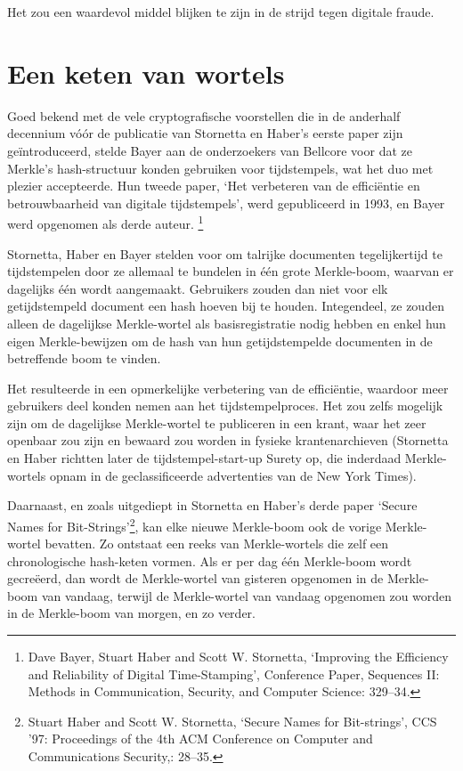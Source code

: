 \documentclass[
  a5paper,
  smalldemyvopaper,11pt,twoside,onecolumn,openright,extrafontsizes]{memoir}
\begin{document}
Het zou een waardevol middel blijken te zijn in de strijd tegen digitale
fraude.

\section{Een keten van wortels}\label{een-keten-van-wortels}

Goed bekend met de vele cryptografische voorstellen die in de anderhalf
decennium vóór de publicatie van Stornetta en Haber's eerste paper zijn
geïntroduceerd, stelde Bayer aan de onderzoekers van Bellcore voor dat
ze Merkle's hash-structuur konden gebruiken voor tijdstempels, wat het
duo met plezier accepteerde. Hun tweede paper, `Het verbeteren van de
efficiëntie en betrouwbaarheid van digitale tijdstempels', werd
gepubliceerd in 1993, en Bayer werd opgenomen als derde auteur.
\footnote{Dave Bayer, Stuart Haber and Scott W. Stornetta, `Improving
  the Efficiency and Reliability of Digital Time-Stamping', Conference
  Paper, Sequences II: Methods in Communication, Security, and Computer
  Science: 329--34.}

Stornetta, Haber en Bayer stelden voor om talrijke documenten
tegelijkertijd te tijdstempelen door ze allemaal te bundelen in één
grote Merkle-boom, waarvan er dagelijks één wordt aangemaakt. Gebruikers
zouden dan niet voor elk getijdstempeld document een hash hoeven bij te
houden. Integendeel, ze zouden alleen de dagelijkse Merkle-wortel als
basisregistratie nodig hebben en enkel hun eigen Merkle-bewijzen om de
hash van hun getijdstempelde documenten in de betreffende boom te
vinden.

Het resulteerde in een opmerkelijke verbetering van de efficiëntie,
waardoor meer gebruikers deel konden nemen aan het tijdstempelproces.
Het zou zelfs mogelijk zijn om de dagelijkse Merkle-wortel te publiceren
in een krant, waar het zeer openbaar zou zijn en bewaard zou worden in
fysieke krantenarchieven (Stornetta en Haber richtten later de
tijdstempel-start-up Surety op, die inderdaad Merkle-wortels opnam in de
geclassificeerde advertenties van de New York Times).

Daarnaast, en zoals uitgediept in Stornetta en Haber's derde paper
`Secure Names for Bit-Strings'\footnote{Stuart Haber and Scott W.
  Stornetta, `Secure Names for Bit-strings', CCS '97: Proceedings of the
  4th ACM Conference on Computer and Communications Security,: 28--35.},
kan elke nieuwe Merkle-boom ook de vorige Merkle-wortel bevatten. Zo
ontstaat een reeks van Merkle-wortels die zelf een chronologische
hash-keten vormen. Als er per dag één Merkle-boom wordt gecreëerd, dan
wordt de Merkle-wortel van gisteren opgenomen in de Merkle-boom van
vandaag, terwijl de Merkle-wortel van vandaag opgenomen zou worden in de
Merkle-boom van morgen, en zo verder.
\end{document}
